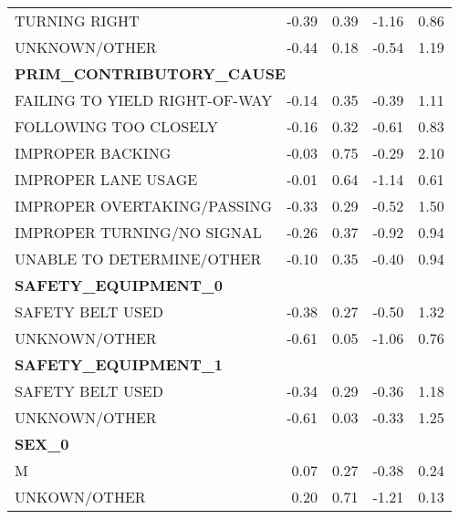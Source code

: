 \begin{tabular}{lrrrr}
TURNING RIGHT        &            -0.39 &             0.39 &             -1.16 &             0.86 \\
UNKNOWN/OTHER        &            -0.44 &             0.18 &             -0.54 &             1.19 \\
\midrule
\multicolumn{5}{l}{\textbf{PRIM\_CONTRIBUTORY\_CAUSE}}\\\addlinespace
FAILING TO YIELD RIGHT-OF-WAY &            -0.14 &             0.35 &             -0.39 &             1.11 \\
FOLLOWING TOO CLOSELY         &            -0.16 &             0.32 &             -0.61 &             0.83 \\
IMPROPER BACKING              &            -0.03 &             0.75 &             -0.29 &             2.10 \\
IMPROPER LANE USAGE           &            -0.01 &             0.64 &             -1.14 &             0.61 \\
IMPROPER OVERTAKING/PASSING   &            -0.33 &             0.29 &             -0.52 &             1.50 \\
IMPROPER TURNING/NO SIGNAL    &            -0.26 &             0.37 &             -0.92 &             0.94 \\
UNABLE TO DETERMINE/OTHER     &            -0.10 &             0.35 &             -0.40 &             0.94 \\
\midrule
\multicolumn{5}{l}{\textbf{SAFETY\_EQUIPMENT\_0}}\\\addlinespace
SAFETY BELT USED &            -0.38 &             0.27 &             -0.50 &             1.32 \\
UNKNOWN/OTHER    &            -0.61 &             0.05 &             -1.06 &             0.76 \\
\midrule
\multicolumn{5}{l}{\textbf{SAFETY\_EQUIPMENT\_1}}\\\addlinespace
SAFETY BELT USED &            -0.34 &             0.29 &             -0.36 &             1.18 \\
UNKNOWN/OTHER    &            -0.61 &             0.03 &             -0.33 &             1.25 \\
\midrule
\multicolumn{5}{l}{\textbf{SEX\_0}}\\\addlinespace
M            &             0.07 &             0.27 &             -0.38 &             0.24 \\
UNKOWN/OTHER &             0.20 &             0.71 &             -1.21 &             0.13 \\
\midrule

\end{tabular}
